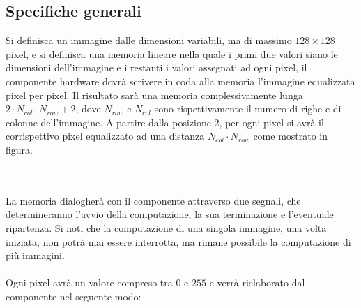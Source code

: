 \documentclass[11pt, a4paper]{article}
\begin{document}
\subsection{Specifiche generali}
Si definisca un immagine dalle dimensioni variabili, ma di massimo $128 \times 128$ pixel, e si definisca una memoria lineare nella quale i primi due valori siano le dimensioni dell'immagine e i restanti i valori assegnati ad ogni pixel, il componente hardware dovrà scrivere in coda alla memoria l'immagine equalizzata pixel per pixel.
Il risultato sarà una memoria complessivamente lunga $2 \cdot N_{col} \cdot N_{row} +2$, dove $N_{row}$ e $N_{col}$ sono rispettivamente il numero di righe e di colonne dell'immagine. A partire dalla posizione 2, per ogni pixel si avrà il corrispettivo pixel equalizzato ad una distanza $N_{col} \cdot N_{row}$ come mostrato in figura.
\\
\\

\\
La memoria dialogherà con il componente attraverso due segnali, che determineranno l'avvio della computazione, la sua terminazione e l'eventuale ripartenza. Si noti che la computazione di una singola immagine, una volta iniziata, non potrà mai essere interrotta, ma rimane possibile la computazione di più immagini.\\
\\
Ogni pixel avrà un valore compreso tra $0$ e $255$ e verrà rielaborato dal componente nel seguente modo:\\
\\
\end{document}
